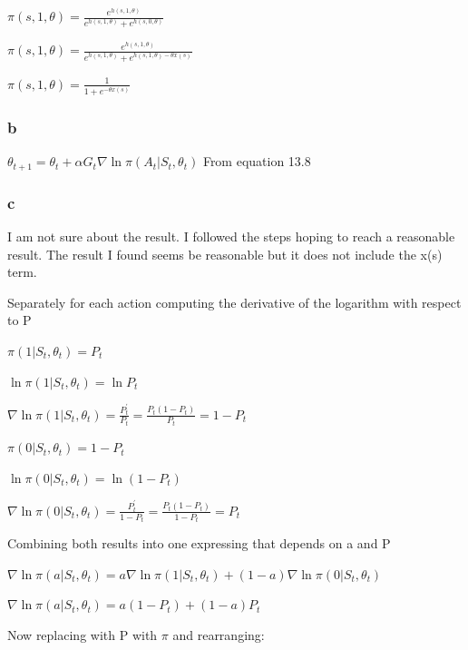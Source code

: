 \documentclass[11pt]{article}
\begin{document}
    \noindent $ \pi(s, 1, \theta) = \frac{e^{h(s,1, \theta)}}{e^{h(s,1, \theta)} + e^{h(s,0, \theta)}} $

    \noindent $ \pi(s, 1, \theta) = \frac{e^{h(s,1, \theta)}}{e^{h(s,1, \theta)} + e^{h(s,1, \theta)-\theta x(s)}} $

    \noindent $ \pi(s, 1, \theta) = \frac{1}{1 + e^{-\theta x(s)}} $

    \subsubsection*{b}

    \noindent $ \theta_{t+1} = \theta_t + \alpha G_t \nabla \ln \pi(A_t | S_t, \theta_t) $ \hfill From equation 13.8

    \subsubsection*{c}

    I am not sure about the result.
    I followed the steps hoping to reach a reasonable result.
    The result I found seems be reasonable but it does not include the x(s) term.

    \hfill \break
    \noindent Separately for each action computing the derivative of the logarithm with respect to P

    \hfill \break
    \noindent $  \pi(1 | S_t, \theta_t) = P_t$

    \noindent $  \ln \pi(1 | S_t, \theta_t) = \ln P_t$

    \noindent $  \nabla \ln \pi(1 | S_t, \theta_t) = \frac{P_t^'}{P_t} = \frac{P_t (1-P_t)}{P_t} = 1-P_t  $

    \hfill \break
    \noindent $  \pi(0 | S_t, \theta_t) = 1- P_t$

    \noindent $  \ln \pi(0 | S_t, \theta_t) = \ln (1- P_t)$

    \noindent $  \nabla \ln \pi(0 | S_t, \theta_t) = \frac{P_t^'}{1-P_t} = \frac{P_t (1-P_t)}{1-P_t} = P_t  $

    \hfill \break
    \noindent Combining both results into one expressing that depends on a and P

    \noindent $  \nabla \ln \pi(a | S_t, \theta_t) = a \nabla \ln \pi(1 | S_t, \theta_t) + (1-a) \nabla \ln \pi(0 | S_t, \theta_t)  $

    \noindent $  \nabla \ln \pi(a | S_t, \theta_t) = a (1- P_t) + (1-a) P_t  $

    \hfill \break
    \noindent Now replacing with P with $\pi$ and rearranging:
\end{document}
